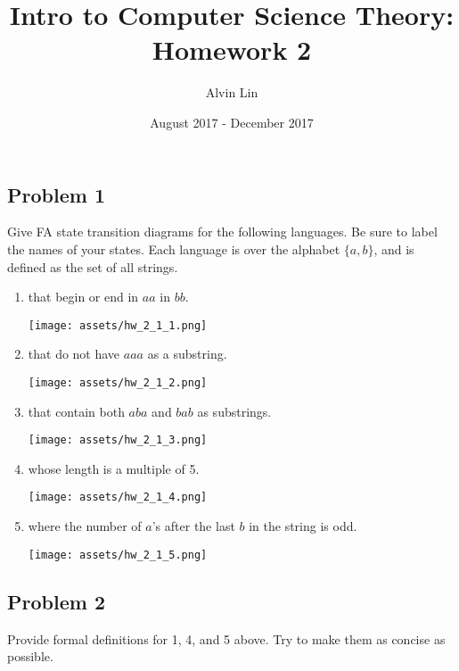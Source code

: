 \documentclass[letterpaper, 12pt]{math}
\title{Intro to Computer Science Theory: Homework 2}
\author{Alvin Lin}
\date{August 2017 - December 2017}
\begin{document}
\maketitle

\subsection*{Problem 1}
Give FA state transition diagrams for the following languages. Be sure to label
the names of your states. Each language is over the alphabet \( \{a,b\} \),
and is defined as the set of all strings.
\begin{enumerate}
  \item that begin or end in \( aa \) in \( bb \).
    \begin{center}
      \texttt{[image: assets/hw\_2\_1\_1.png]}
    \end{center}
  \item that do not have \( aaa \) as a substring.
    \begin{center}
      \texttt{[image: assets/hw\_2\_1\_2.png]}
    \end{center}
  \item that contain both \( aba \) and \( bab \) as substrings.
    \begin{center}
      \texttt{[image: assets/hw\_2\_1\_3.png]}
    \end{center}
  \item whose length is a multiple of 5.
    \begin{center}
      \texttt{[image: assets/hw\_2\_1\_4.png]}
    \end{center}
  \item where the number of \( a \)'s after the last \( b \) in the string is
    odd.
    \begin{center}
      \texttt{[image: assets/hw\_2\_1\_5.png]}
    \end{center}
\end{enumerate}

\subsection*{Problem 2}
Provide formal definitions for 1, 4, and 5 above. Try to make them as concise
as possible.
\end{document}
